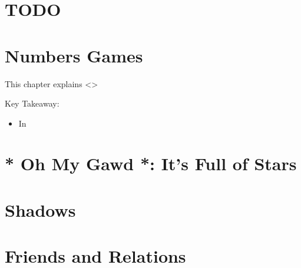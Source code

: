 \documentclass[11pt]{article}
\begin{document}
\section{{\bfseries\sffamily TODO} }
\label{sec:org6dde17e}
\newpage

\section{Numbers Games}
\label{sec:org8885e0d}

This chapter explains <>

\vspace{1em}

Key Takeaway:


\vspace{1em}

\begin{itemize}
\item In
\end{itemize}








































\newpage

\section{* Oh My Gawd *: It's Full of Stars}
\label{sec:org7fbab09}

\newpage

\section{Shadows}
\label{sec:org2386b8e}

\newpage

\section{Friends and Relations}
\label{sec:org424738e}
\end{document}
